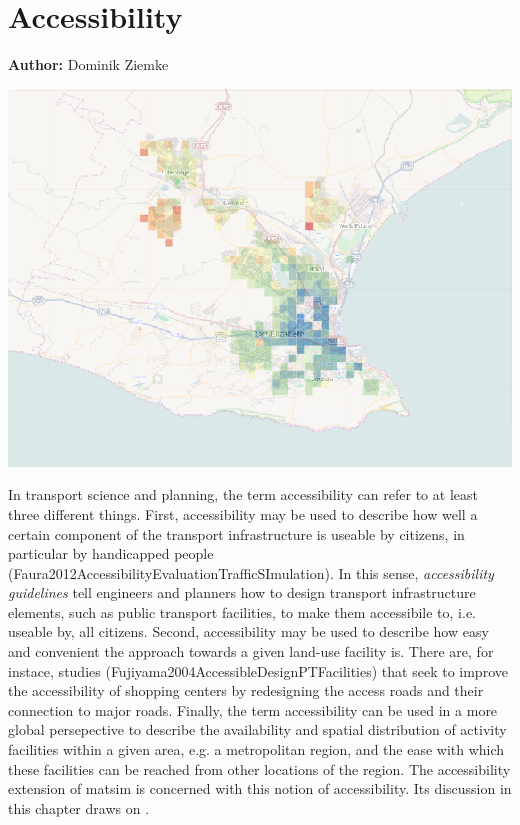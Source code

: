 \chapter{Accessibility}
\label{ch:accessibility}

\hfill \textbf{Author:} Dominik Ziemke

\begin{center} \includegraphics[width=1.\textwidth, angle=0]{extending/figures/accessibility/w_freeSpeed_snapshot.png} \end{center}



In transport science and planning, the term accessibility can refer to at least three different things. First, accessibility may be used to describe how well a certain component of the transport infrastructure is useable by citizens, in particular by handicapped people (Faura2012AccessibilityEvaluationTrafficSImulation). In this sense, \textit{accessibility guidelines} tell engineers and planners how to design transport infrastructure elements, such as public transport facilities, to make them accessibile to, i.e. useable by, all citizens. Second, accessibility may be used to describe how easy and convenient the approach towards a given land-use facility is. There are, for instace, studies (Fujiyama2004AccessibleDesignPTFacilities) that seek to improve the accessibility of shopping centers by redesigning the access roads and their connection to major roads. Finally, the term accessibility can be used in a more global persepective to describe the availability and spatial distribution of activity facilities within a given area, e.g. a metropolitan region, and the ease with which these facilities can be reached from other locations of the region. The accessibility extension of \gls{matsim} is concerned with this notion of accessibility. Its discussion in this chapter draws on \citet{NicolaiNagel2012HiResAccessibilityMethodInBook}.

